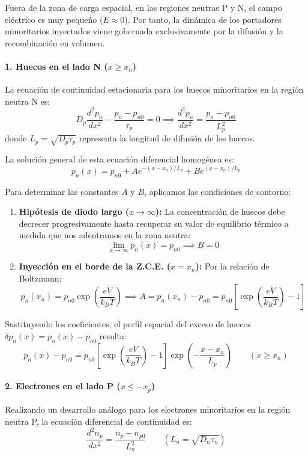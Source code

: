 Fuera de la zona de carga espacial, en las regiones neutras P y N, el campo eléctrico es muy pequeño ($E \approx 0$). Por tanto, la dinámica de los portadores minoritarios inyectados viene gobernada exclusivamente por la difusión y la recombinación en volumen.

\paragraph{1. Huecos en el lado N ($x \ge x_n$)}
La ecuación de continuidad estacionaria para los huecos minoritarios en la región neutra N es:
\[
D_p \frac{d^2 p_n}{dx^2} - \frac{p_n - p_{n0}}{\tau_p} = 0 \implies \frac{d^2 p_n}{dx^2} = \frac{p_n - p_{n0}}{L_p^2}
\]
donde $L_p = \sqrt{D_p \tau_p}$ representa la longitud de difusión de los huecos.

La solución general de esta ecuación diferencial homogénea es:
\[
p_n(x) = p_{n0} + A e^{-(x - x_n)/L_p} + B e^{(x - x_n)/L_p}
\]

Para determinar las constantes $A$ y $B$, aplicamos las condiciones de contorno:
\begin{enumerate}[label=\alph*)]
    \item \textbf{Hipótesis de diodo largo ($x \to \infty$):} La concentración de huecos debe decrecer progresivamente hasta recuperar su valor de equilibrio térmico a medida que nos adentramos en la zona neutra:
    \[
    \lim_{x \to \infty} p_n(x) = p_{n0} \implies B = 0
    \]
    \item \textbf{Inyección en el borde de la Z.C.E. ($x = x_n$):} Por la relación de Boltzmann:
    \[
    p_n(x_n) = p_{n0} \exp\left(\frac{e V}{k_B T}\right) \implies A = p_n(x_n) - p_{n0} = p_{n0} \left[ \exp\left(\frac{e V}{k_B T}\right) - 1 \right]
    \]
\end{enumerate}

Sustituyendo los coeficientes, el perfil espacial del exceso de huecos $\delta p_n(x) = p_n(x) - p_{n0}$ resulta:
\[
p_n(x) - p_{n0} = p_{n0} \left[ \exp\left(\frac{e V}{k_B T}\right) - 1 \right] \exp\left(-\frac{x - x_n}{L_p}\right) \qquad (x \ge x_n)
\]

\paragraph{2. Electrones en el lado P ($x \le -x_p$)}
Realizando un desarrollo análogo para los electrones minoritarios en la región neutra P, la ecuación diferencial de continuidad es:
\[
\frac{d^2 n_p}{dx^2} = \frac{n_p - n_{p0}}{L_n^2} \qquad (L_n = \sqrt{D_n \tau_n})
\]

